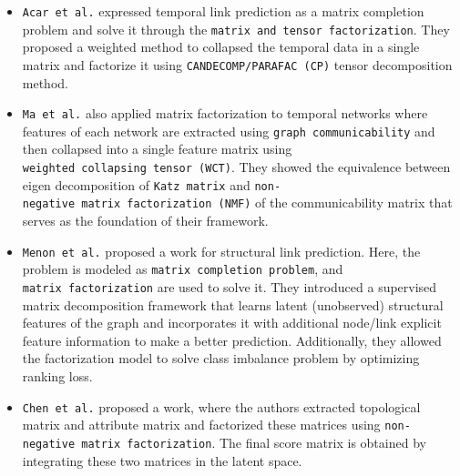 \begin{itemize}
    \item
          \texttt{Acar\ et\ al.} expressed temporal link prediction as a matrix
          completion problem and solve it through the
          \texttt{matrix\ and\ tensor\ factorization}. They proposed a weighted
          method to collapsed the temporal data in a single matrix and factorize
          it using \texttt{CANDECOMP/PARAFAC\ (CP)} tensor decomposition method.
    \item
          \texttt{Ma\ et\ al.} also applied matrix factorization to temporal
          networks where features of each network are extracted using
          \texttt{graph\ communicability} and then collapsed into a single
          feature matrix using \texttt{weighted\ collapsing\ tensor\ (WCT)}.
          They showed the equivalence between eigen decomposition of
          \texttt{Katz\ matrix} and
          \texttt{non-negative\ matrix\ factorization\ (NMF)} of the
          communicability matrix that serves as the foundation of their
          framework.
    \item
          \texttt{Menon\ et\ al.} proposed a work for structural link
          prediction. Here, the problem is modeled as
          \texttt{matrix\ completion\ problem}, and
          \texttt{matrix\ factorization} are used to solve it. They introduced a
          supervised matrix decomposition framework that learns latent
          (unobserved) structural features of the graph and incorporates it with
          additional node/link explicit feature information to make a better
          prediction. Additionally, they allowed the factorization model to
          solve class imbalance problem by optimizing ranking loss.
    \item
          \texttt{Chen\ et\ al.} proposed a work, where the authors extracted
          topological matrix and attribute matrix and factorized these matrices
          using \texttt{non-negative\ matrix\ factorization}. The final score
          matrix is obtained by integrating these two matrices in the latent
          space.
\end{itemize}